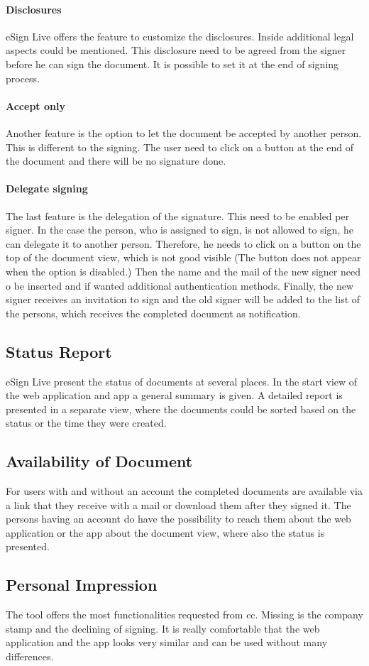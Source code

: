 \paragraph{Disclosures}
eSign Live offers the feature to customize the disclosures. Inside additional legal aspects could be mentioned. This disclosure need to be agreed from the signer before he can sign the document. It is possible to set it at the end of signing process. 

\paragraph{Accept only}
Another feature is the option to let the document be accepted by another person. This is different to the signing. The user need to click on a button at the end of the document and there will be no signature done.

\paragraph{Delegate signing} 
The last feature is the delegation of the signature. This need to be enabled per signer. In the case the person, who is assigned to sign, is not allowed to sign, he can delegate it to another person. Therefore, he needs to click on a button on the top of the document view, which is not good visible (The button does not appear when the option is disabled.) Then the name and the mail of the new signer need o be inserted and if wanted additional authentication methods. Finally, the new signer receives an invitation to sign and the old signer will be added to the list of the persons, which receives the completed document as notification.

\subsection{Status Report}
eSign Live present the status of documents at several places. In the start view of the web application and \gls{app} a general summary is given. A detailed report is presented in a separate view, where the documents could be sorted based on the status or the time they were created.

\subsection{Availability of Document}
For users with and without an account the completed documents are available via a link that they receive with a mail or download them after they signed it. The persons having an account do have the possibility to reach them about the web application or the \gls{app} about the document view, where also the status is presented.

\subsection{Personal Impression}
The tool offers the most functionalities requested from \gls{cc}. Missing is the company stamp and the declining of signing. It is really comfortable that the web application and the \gls{app} looks very similar and can be used without many differences.